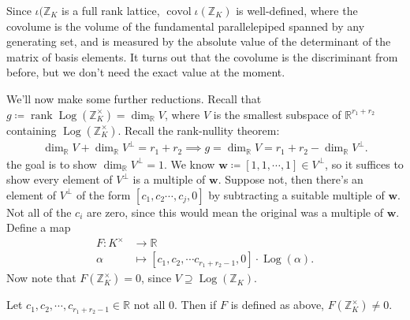 \begin{remark}

Since \(\iota({\mathbb{Z}}_K\) is a full rank lattice,
\(\operatorname{covol}\iota({\mathbb{Z}}_K)\) is well-defined, where the
covolume is the volume of the fundamental parallelepiped spanned by any
generating set, and is measured by the absolute value of the determinant
of the matrix of basis elements. It turns out that the covolume is the
discriminant from before, but we don't need the exact value at the
moment.

\end{remark}

\begin{remark}

We'll now make some further reductions. Recall that
\(g\coloneqq\operatorname{rank}\operatorname{Log}({\mathbb{Z}}_K^{\times}) = \dim_{\mathbb{R}}V\),
where \(V\) is the smallest subspace of \({\mathbb{R}}^{r_1 + r_2}\)
containing \(\operatorname{Log}({\mathbb{Z}}_K^{\times})\). Recall the
rank-nullity theorem:
\begin{align*}
\dim_{\mathbb{R}}V + \dim_{\mathbb{R}}V^\perp = r_1 + r_2
\implies g = \dim_{\mathbb{R}}V = r_1 + r_2 - \dim_{\mathbb{R}}V^\perp
.\end{align*}
the goal is to show \(\dim_{\mathbb{R}}V^\perp = 1\). We know
\(\mathbf{w} \coloneqq{\left[ {1, 1, \cdots, 1} \right]} \in V^\perp\),
so it suffices to show every element of \(V^\perp\) is a multiple of
\(\mathbf{w}\). Suppose not, then there's an element of \(V^\perp\) of
the form \({\left[ {c_1, c_2 \cdots, c_j, 0} \right]}\) by subtracting a
suitable multiple of \(\mathbf{w}\). Not all of the \(c_i\) are zero,
since this would mean the original was a multiple of \(\mathbf{w}\).
Define a map
\begin{align*}
F: K^{\times}&\to {\mathbb{R}}\\
\alpha&\mapsto {\left[ {c_1, c_2, \cdots c_{r_1 + r_2 - 1}, 0 } \right]} \cdot \operatorname{Log}( \alpha)
.\end{align*}
Now note that \(F({\mathbb{Z}}_K^{\times}) = 0\), since
\(V \supseteq \operatorname{Log}({\mathbb{Z}}_K)\).

\end{remark}

\begin{proposition}[?]

Let \(c_1, c_2, \cdots, c_{r_1 + r_2 - 1} \in {\mathbb{R}}\) not all 0.
Then if \(F\) is defined as above,
\(F({\mathbb{Z}}_K^{\times}) \neq 0\).

\end{proposition}

